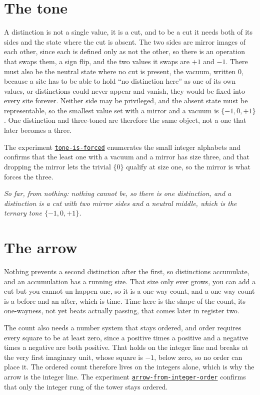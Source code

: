 \documentclass{article}
\newcommand{\code}[2]{\href{https://github.com/cluesurf/vibe/blob/make/#1}{\texttt{#2}}}
\begin{document}
\section{The tone}

A distinction is not a single value, it is a cut, and to be a cut it needs both of its sides and
the state where the cut is absent. The two sides are mirror images of each other, since each is
defined only as not the other, so there is an operation that swaps them, a sign flip, and the two
values it swaps are $+1$ and $-1$. There must also be the neutral state where no cut is present,
the vacuum, written $0$, because a site has to be able to hold ``no distinction here'' as one of
its own values, or distinctions could never appear and vanish, they would be fixed into every
site forever. Neither side may be privileged, and the absent state must be representable, so the
smallest value set with a mirror and a vacuum is $\{-1, 0, +1\}$. One distinction and three-toned
are therefore the same object, not a one that later becomes a three.

The experiment
\code{test/experiment/foundations/tone-is-forced.ts}{tone-is-forced} enumerates the small integer
alphabets and confirms that the least one with a vacuum and a mirror has size three, and that
dropping the mirror lets the trivial $\{0\}$ qualify at size one, so the mirror is what forces the
three.

\emph{So far, from nothing: nothing cannot be, so there is one distinction, and a distinction is a
cut with two mirror sides and a neutral middle, which is the ternary tone $\{-1,0,+1\}$.}

\section{The arrow}

Nothing prevents a second distinction after the first, so distinctions accumulate, and an
accumulation has a running size. That size only ever grows, you can add a cut but you cannot
un-happen one, so it is a one-way count, and a one-way count is a before and an after, which is
time. Time here is the shape of the count, its one-wayness, not yet beats actually passing, that
comes later in register two.

The count also needs a number system that stays ordered, and order
requires every square to be at least zero, since a positive times a positive and a negative times
a negative are both positive. That holds on the integer line and breaks at the very first
imaginary unit, whose square is $-1$, below zero, so no order can place it. The ordered count
therefore lives on the integers alone, which is why the arrow is the integer line. The experiment
\code{test/experiment/foundations/arrow-from-integer-order.ts}{arrow-from-integer-order} confirms
that only the integer rung of the tower stays ordered.
\end{document}
